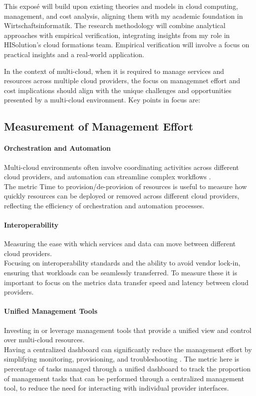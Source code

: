This exposé will build upon existing theories and models in cloud computing, management, 
and cost analysis, aligning them with my academic foundation in Wirtschaftsinformatik. 
The research methodology will combine analytical approaches with empirical verification, 
integrating insights from my role in HISolution's cloud formations team. 
Empirical verification will involve a focus on practical insights and a real-world application.

In the context of multi-cloud, when it is required to manage services and resources 
across multiple cloud providers, the focus on managemnet effort and cost implications should 
align with the unique challenges and opportunities presented by a multi-cloud environment. 
Key points in focus are:

\subsection{Measurement of Management Effort}

\paragraph{Orchestration and Automation}
Multi-cloud environments often involve coordinating activities across different cloud providers, 
and automation can streamline complex workflows \cite{rajAutomatedMulticloudOperations2018}.\\
The metric Time to provision/de-provision of resources is useful to
measure how quickly resources can be deployed or 
removed across different cloud providers, 
reflecting the efficiency of orchestration and automation processes.

\paragraph{Interoperability}
Measuring the ease with which services and data can move between different cloud providers. \\
Focusing on interoperability standards and the ability to avoid vendor lock-in, 
ensuring that workloads can be seamlessly transferred\cite{ramalingamAddressingSemanticsStandards2021}.
To measure these it is important to focus on the metrics data transfer speed and 
latency between cloud providers\cite{yawCooperativeGroupProvisioning2015}.

\paragraph{Unified Management Tools}
Investing in or leverage management tools that provide a unified view and control over 
multi-cloud resources. \\
Having a centralized dashboard can significantly reduce the management 
effort by simplifying monitoring, provisioning, and troubleshooting \cite{HybridMulticloudMonitoring} \cite{bindlishHybridMultiCloudMonitoring2021}.
The metric here is percentage of tasks managed through a unified dashboard
to track the proportion of management tasks that can be performed through a centralized 
management tool, to reduce the need for interacting with individual provider interfaces.

